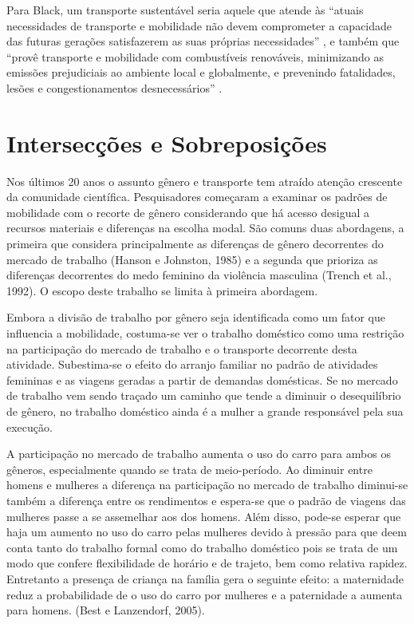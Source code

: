Para Black, um transporte sustentável seria aquele que atende às ``atuais necessidades de transporte e mobilidade não devem comprometer a capacidade das futuras gerações satisfazerem as suas próprias necessidades'' \cite[p.151]{BLACK1996}, e também que ``provê transporte e mobilidade com combustíveis renováveis, minimizando as emissões prejudiciais ao ambiente local e globalmente, e prevenindo fatalidades, lesões e congestionamentos desnecessários'' \cite[p.12]{BLACK2010}.

\clearpage
\section{Intersecções e Sobreposições}

Nos últimos 20 anos o assunto gênero e transporte tem atraído atenção crescente da comunidade científica. Pesquisadores começaram a examinar os padrões de mobilidade com o recorte de gênero considerando que há acesso desigual a recursos materiais e diferenças na escolha modal. São comuns duas abordagens, a primeira que considera principalmente as diferenças de gênero decorrentes do mercado de trabalho (Hanson e Johnston, 1985) e a segunda que prioriza as diferenças decorrentes do medo feminino da violência masculina (Trench et al., 1992). O escopo deste trabalho se limita à primeira abordagem.

Embora a divisão de trabalho por gênero seja identificada como um fator que influencia a mobilidade, costuma-se ver o trabalho doméstico como uma restrição na participação do mercado de trabalho e o transporte decorrente desta atividade. Subestima-se o efeito do arranjo familiar no padrão de atividades femininas e as viagens geradas a partir de demandas domésticas. Se no mercado de trabalho vem sendo traçado um caminho que tende a diminuir o desequilíbrio de gênero, no trabalho doméstico ainda é a mulher a grande responsável pela sua execução.

A participação no mercado de trabalho aumenta o uso do carro para ambos os gêneros, especialmente quando se trata de meio-período. Ao diminuir entre homens e mulheres a diferença na participação no mercado de trabalho diminui-se também a diferença entre os rendimentos e espera-se que o padrão de viagens das mulheres passe a se assemelhar aos dos homens. Além disso, pode-se esperar que haja um aumento no uso do carro pelas mulheres devido à pressão para que deem conta tanto do trabalho formal como do trabalho doméstico pois se trata de um modo que confere flexibilidade de horário e de trajeto, bem como relativa rapidez. Entretanto a presença de criança na família gera o seguinte efeito: a maternidade reduz a probabilidade de o uso do carro por mulheres e a paternidade a aumenta para homens. (Best e Lanzendorf, 2005).


